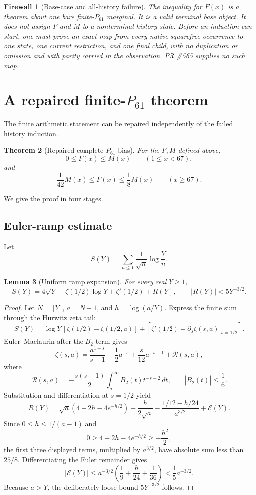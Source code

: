 \documentclass[11pt]{article}
\newtheorem{theorem}{Theorem}[section]
\newtheorem{lemma}[theorem]{Lemma}
\newtheorem{firewall}[theorem]{Firewall}
\newcommand{\1}{\mathbf 1}
\begin{document}
\begin{firewall}[Base-case and all-history failure]
The inequality for $F(x)$ is a theorem about one bare finite-$P_{61}$ marginal.  It is a valid terminal base object.  It does not assign $F$ and $M$ to a nonterminal history state.  Before an induction can start, one must prove an exact map from every native squarefree occurrence to one state, one current restriction, and one final child, with no duplication or omission and with parity carried in the observation.  PR \#565 supplies no such map.
\end{firewall}

\section{A repaired finite-$P_{61}$ theorem}

The finite arithmetic statement can be repaired independently of the failed history induction.

\begin{theorem}[Repaired complete $P_{61}$ bias]\label{thm:p61}
For the $F,M$ defined above,
\[
0\le F(x)\le M(x)\qquad(1\le x<67),
\]
and
\[
\boxed{\frac1{42}M(x)\le F(x)\le\frac18M(x)\qquad(x\ge67).}
\]
\end{theorem}

We give the proof in four stages.

\subsection{Euler-ramp estimate}

Let
\[
S(Y)=\sum_{n\le Y}\frac1{\sqrt n}\log\frac Yn.
\]

\begin{lemma}[Uniform ramp expansion]\label{lem:ramp}
For every real $Y\ge1$,
\[
S(Y)=4\sqrt Y+\zeta(1/2)\log Y+\zeta'(1/2)+R(Y),
\qquad |R(Y)|<5Y^{-3/2}.
\]
\end{lemma}
\begin{proof}
Let $N=\lfloor Y\rfloor$, $a=N+1$, and $h=\log(a/Y)$.  Express the finite sum through the Hurwitz zeta tail:
\[
S(Y)=\log Y\,[\zeta(1/2)-\zeta(1/2,a)]
+[\zeta'(1/2)-\partial_s\zeta(s,a)|_{s=1/2}].
\]
Euler--Maclaurin after the $B_2$ term gives
\[
\zeta(s,a)=\frac{a^{1-s}}{s-1}+\frac12a^{-s}
+\frac{s}{12}a^{-s-1}+\mathcal R(s,a),
\]
where
\[
\mathcal R(s,a)=-\frac{s(s+1)}2
\int_a^\infty \overline B_2(t)t^{-s-2}\,dt,
\qquad |\overline B_2(t)|\le\frac16.
\]
Substitution and differentiation at $s=1/2$ yield
\[
R(Y)=\sqrt a(4-2h-4e^{-h/2})
+\frac h{2\sqrt a}
-\frac{1/12-h/24}{a^{3/2}}+\mathcal E(Y).
\]
Since $0\le h\le1/(a-1)$ and
\[
0\ge4-2h-4e^{-h/2}\ge-\frac{h^2}{2},
\]
the first three displayed terms, multiplied by $a^{3/2}$, have absolute sum less than $25/8$.  Differentiating the Euler remainder gives
\[
|\mathcal E(Y)|
\le a^{-3/2}\left(\frac19+\frac h{24}+\frac1{36}\right)
<\frac15a^{-3/2}.
\]
Because $a>Y$, the deliberately loose bound $5Y^{-3/2}$ follows.
\end{proof}
\end{document}
